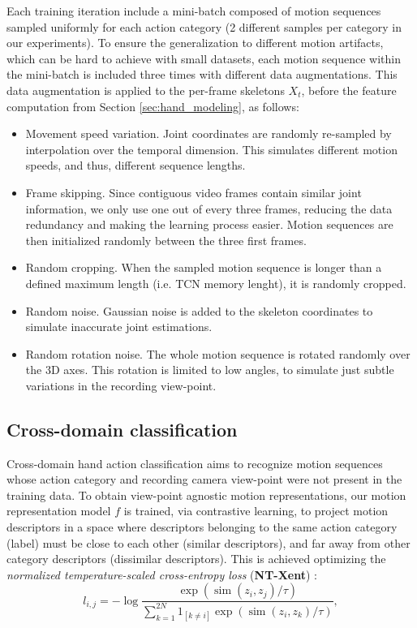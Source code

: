 \documentclass[letterpaper, 10 pt, conference]{ieeeconf}
\begin{document}
Each training iteration include a mini-batch composed of motion sequences sampled uniformly for each action category (2 different samples per category in our experiments).
To ensure the generalization to different motion artifacts, which can be hard to achieve with small datasets,
each motion sequence within the mini-batch is included three times with different data augmentations. This data augmentation is applied to the per-frame skeletons \(X_t\), before the feature computation from Section \ref{sec:hand_modeling}, as follows:
\begin{itemize}
    \item Movement speed variation. Joint coordinates are randomly re-sampled by interpolation over the temporal dimension. This simulates different motion speeds, and thus, different sequence lengths.
    \item Frame skipping. Since contiguous video frames contain similar joint information, we only use one out of every three frames, reducing the data redundancy and making the learning process easier. Motion sequences are then initialized randomly between the three first frames.
    \item Random cropping. When the sampled motion sequence is longer than a defined maximum length (i.e. TCN memory lenght), it is randomly cropped.
    \item Random noise. Gaussian noise is added to the skeleton coordinates to simulate inaccurate joint estimations.
    \item Random rotation noise. The whole motion sequence is rotated randomly over the 3D axes. This rotation is limited to low angles, to simulate just subtle variations in the recording view-point. 
\end{itemize}




\subsection{Cross-domain classification}\label{sec:xdom}

Cross-domain hand action classification aims to recognize motion sequences whose action category and recording camera view-point were not present in the training data. To obtain view-point agnostic motion representations, our motion representation model \(f\) is trained, via contrastive learning, to project motion descriptors in a space where
descriptors belonging to the same action category (label) must be close to each other (similar descriptors), and far away from other category descriptors (dissimilar descriptors).
This is achieved optimizing 
the \textit{normalized temperature-scaled cross-entropy loss} (\textbf{NT-Xent}) \cite{chen2020simple}:
\begin{equation}
    l_{i, j}=-\log \frac{\exp \left(\operatorname{sim}\left(z_{i}, z_{j}\right) / \tau\right)}{\sum_{k=1}^{2 N} 1_{[k \neq i]} \exp \left(\operatorname{sim}\left(z_{i}, z_{k}\right) / \tau\right)},
\label{eq:loss}
\end{equation}
\end{document}
